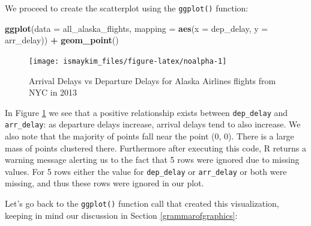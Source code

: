 \documentclass[12pt,]{krantz}
\makeatletter
\newenvironment{Shaded}{\begin{snugshade}}{\end{snugshade}}
\newcommand{\KeywordTok}[1]{\textcolor[rgb]{0.27,0.27,0.27}{\textbf{#1}}}
\newcommand{\DataTypeTok}[1]{\textcolor[rgb]{0.27,0.27,0.27}{#1}}
\newcommand{\StringTok}[1]{\textcolor[rgb]{0.5,0.5,0.5}{#1}}
\newcommand{\OperatorTok}[1]{\textcolor[rgb]{0.43,0.43,0.43}{\textbf{#1}}}
\newcommand{\NormalTok}[1]{#1}
\newenvironment{kframe}{%
\medskip{}
\setlength{\fboxsep}{.8em}
 \def\at@end@of@kframe{}%
 \ifinner\ifhmode%
  \def\at@end@of@kframe{\end{minipage}}%
  \begin{minipage}{\columnwidth}%
 \fi\fi%
 \def\FrameCommand##1{\hskip\@totalleftmargin \hskip-\fboxsep
 \colorbox{shadecolor}{##1}\hskip-\fboxsep
     \hskip-\linewidth \hskip-\@totalleftmargin \hskip\columnwidth}%
 \MakeFramed {\advance\hsize-\width
   \@totalleftmargin\z@ \linewidth\hsize
   \@setminipage}}%
 {\par\unskip\endMakeFramed%
 \at@end@of@kframe}
\renewenvironment{Shaded}{\begin{kframe}}{\end{kframe}}
\makeatother
\begin{document}
We proceed to create the scatterplot using the \texttt{ggplot()}
function:

\begin{Shaded}
\begin{Highlighting}[]
\KeywordTok{ggplot}\NormalTok{(}\DataTypeTok{data =}\NormalTok{ all_alaska_flights, }
       \DataTypeTok{mapping =} \KeywordTok{aes}\NormalTok{(}\DataTypeTok{x =}\NormalTok{ dep_delay, }\DataTypeTok{y =}\NormalTok{ arr_delay)) }\OperatorTok{+}\StringTok{ }
\StringTok{  }\KeywordTok{geom_point}\NormalTok{()}
\end{Highlighting}
\end{Shaded}

\begin{figure}

{\centering \texttt{[image: ismaykim\_files/figure-latex/noalpha-1]} 

}

\caption{Arrival Delays vs Departure Delays for Alaska Airlines flights from NYC in 2013}\label{fig:noalpha}
\end{figure}

In Figure \ref{fig:noalpha} we see that a positive relationship exists
between \texttt{dep\_delay} and \texttt{arr\_delay}: as departure delays
increase, arrival delays tend to also increase. We also note that the
majority of points fall near the point (0, 0). There is a large mass of
points clustered there. Furthermore after executing this code, R returns
a warning message alerting us to the fact that 5 rows were ignored due
to missing values. For 5 rows either the value for \texttt{dep\_delay}
or \texttt{arr\_delay} or both were missing, and thus these rows were
ignored in our plot.

Let's go back to the \texttt{ggplot()} function call that created this
visualization, keeping in mind our discussion in Section
\ref{grammarofgraphics}:
\end{document}
